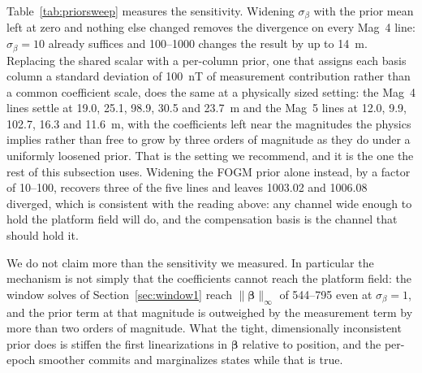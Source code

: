 Table~\ref{tab:priorsweep} measures the sensitivity. Widening $\sigma_{\beta}$
with the prior mean left at zero and nothing else changed removes the divergence
on every Mag~4 line: $\sigma_{\beta}=10$ already suffices and
\numrange{100}{1000} changes the result by up to \SI{14}{\meter}. Replacing the
shared scalar with a per-column prior, one that assigns each basis column a
standard deviation of \SI{100}{\nano\tesla} of measurement contribution rather
than a common coefficient scale, does the same at a physically sized setting: the
Mag~4 lines settle at \SI{19.0}{}, \SI{25.1}{}, \SI{98.9}{}, \SI{30.5}{} and
\SI{23.7}{\meter} and the Mag~5 lines at \SI{12.0}{}, \SI{9.9}{}, \SI{102.7}{},
\SI{16.3}{} and \SI{11.6}{\meter}, with the coefficients left near the magnitudes
the physics implies rather than free to grow by three orders of magnitude as they
do under a uniformly loosened prior. That is the setting we recommend, and it is
the one the rest of this subsection uses. Widening the FOGM prior alone instead,
by a factor of \numrange{10}{100}, recovers three of the five lines and leaves
1003.02 and 1006.08 diverged, which is consistent with the reading above: any
channel wide enough to hold the platform field will do, and the compensation
basis is the channel that should hold it.

We do not claim more than the sensitivity we measured. In particular the
mechanism is not simply that the coefficients cannot reach the platform field:
the window solves of Section~\ref{sec:window1} reach $\|\boldsymbol{\beta}\|_\infty$
of \numrange{544}{795} even at $\sigma_{\beta}=1$, and the prior term at that
magnitude is outweighed by the measurement term by more than two orders of
magnitude. What the tight, dimensionally inconsistent prior does is stiffen the
first linearizations in $\boldsymbol{\beta}$ relative to position, and the
per-epoch smoother commits and marginalizes states while that is true.

